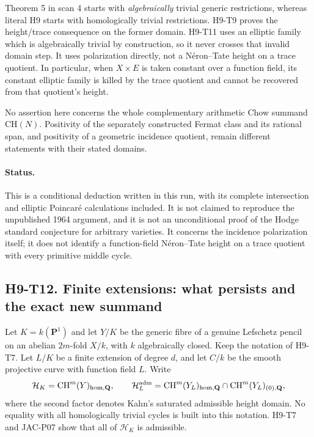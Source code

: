 \documentclass[11pt,a4paper]{article}
\begin{document}
Theorem 5 in scan 4 starts with \emph{algebraically} trivial generic
restrictions, whereas literal H9 starts with homologically trivial
restrictions. H9-T9 proves the height/trace consequence on the former
domain. H9-T11 uses an elliptic family which is algebraically trivial
by construction, so it never crosses that invalid domain step.
It uses polarization directly, not a N\'eron--Tate height on a trace
quotient. In particular, when $X\times E$ is taken constant over a
function field, its constant elliptic family is killed by the trace
quotient and cannot be recovered from that quotient's height.

No assertion here concerns the whole complementary arithmetic Chow
summand $\mathrm{CH}(N)$. Positivity of the separately constructed
Fermat class and its rational span, and positivity of a geometric
incidence quotient, remain different statements with their stated
domains.

\paragraph{Status.}
This is a conditional deduction written in this run, with its complete
intersection and elliptic Poincar\'e calculations included. It is not
claimed to reproduce the unpublished 1964 argument, and it is not an
unconditional proof of the Hodge standard conjecture for arbitrary
varieties. It concerns the incidence polarization itself; it does not
identify a function-field N\'eron--Tate height on a trace quotient with
every primitive middle cycle.



\subsection*{H9-T12. Finite extensions: what persists and the exact new summand}

Let $K=k(\mathbf P^1)$ and let $Y/K$ be the generic fibre of a genuine
Lefschetz pencil on an abelian $2m$-fold $X/k$, with $k$ algebraically
closed. Keep the notation of H9-T7. Let $L/K$ be a finite extension of
degree $d$, and let $C/k$ be the smooth projective curve with function
field $L$. Write
\[
 \mathcal H_K=\operatorname{CH}^m(Y)_{\rm hom,\mathbf Q},
 \qquad
 \mathcal H_L^{\rm adm}
 =\operatorname{CH}^m(Y_L)_{\rm hom,\mathbf Q}
       \cap\operatorname{CH}^m(Y_L)_{(0),\mathbf Q},
\]
where the second factor denotes Kahn's saturated admissible height
domain. No equality with all homologically trivial cycles is built into
this notation. H9-T7 and JAC-P07 show that all of $\mathcal H_K$ is
admissible.
\end{document}
